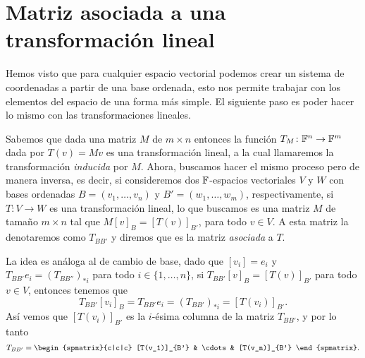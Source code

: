 \section{Matriz asociada a una transformación lineal}

Hemos visto que para cualquier espacio vectorial podemos crear un sistema de coordenadas a partir de una base ordenada, esto nos permite trabajar con los elementos del espacio de una forma más simple. El siguiente paso es poder hacer lo mismo con las transformaciones lineales.

Sabemos que dada una matriz $M$ de $m \times n$ entonces la función $T_M \colon \mathbb{F}^n \to \mathbb{F}^m$ dada por $T(v) = Mv$  es una transformación lineal, a la cual llamaremos la transformación \emph{inducida} por $M$. Ahora, buscamos hacer el mismo proceso pero de manera inversa, es decir, si consideremos dos $\mathbb{F}$-espacios vectoriales $V$ y $W$ con bases ordenadas $B = (v_1,\ldots,v_n)$ y $B' = (w_1,\ldots,w_m)$, respectivamente, si $T\colon V \to W$ es una transformación lineal, lo que buscamos es una matriz $M$ de tamaño $m\times n$ tal que $M[v]_B = [T(v)]_{B'}$, para todo $v \in V$. A esta matriz la denotaremos como $T_{BB'}$ y diremos que es la matriz \emph{asociada} a $T$.

La idea es análoga al de cambio de base, dado que $[v_i] = e_i$ y $T_{BB'}e_i = (T_{BB''})_{*i}$ para todo $i \in \{1,\ldots,n\}$, si $T_{BB'}[v]_B = [T(v)]_{B'}$ para todo $v \in V$, entonces tenemos que
  \[ T_{BB'} [v_i]_B = T_{BB'} e_i = (T_{BB'})_{*i} = [T(v_i)]_{B'}. \]
Así vemos que $[T(v_i)]_{B'}$ es la $i$-ésima columna de la matriz $T_{BB'}$, y por lo tanto
  \[ T_{BB'} = \begin{spmatrix}{c|c|c}  [T(v_1)]_{B'} & \cdots & [T(v_n)]_{B'}  \end{spmatrix}. \]

